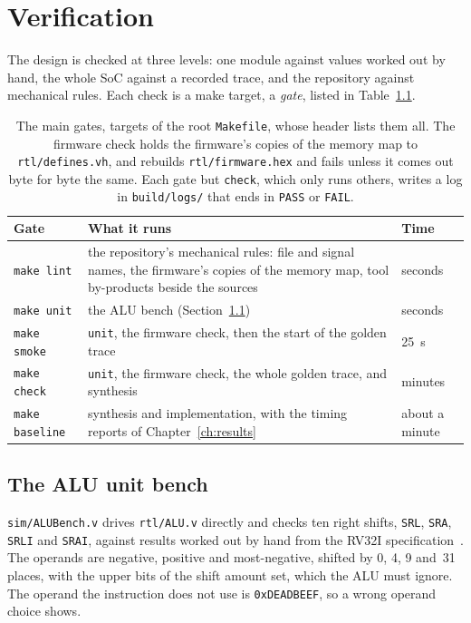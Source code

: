 \documentclass[11pt,a4paper]{report}
\begin{document}
\chapter{Verification}
\label{ch:verif}

The design is checked at three levels: one module against values worked out by hand, the
whole SoC against a recorded trace, and the repository against mechanical rules. Each check
is a make target, a \emph{gate}, listed in Table~\ref{tab:gates}.

\begin{table}[!ht]
  \centering
  \small
  \begin{tabular}{@{}l>{\raggedright\arraybackslash}p{9.4cm}l@{}}
    \toprule
    Gate & What it runs & Time \\
    \midrule
    \texttt{make lint} & the repository's mechanical rules: file and signal names, the
      firmware's copies of the memory map, tool by-products beside the sources & seconds \\
    \texttt{make unit} & the ALU bench (Section~\ref{sec:alu-bench}) & seconds \\
    \texttt{make smoke} & \texttt{unit}, the firmware check, then the start of the golden
      trace & 25~s \\
    \texttt{make check} & \texttt{unit}, the firmware check, the whole golden trace, and
      synthesis & minutes \\
    \texttt{make baseline} & synthesis and implementation, with the timing reports of
      Chapter~\ref{ch:results} & about a minute \\
    \bottomrule
  \end{tabular}
  \caption{The main gates, targets of the root \texttt{Makefile}, whose header lists them
    all. The firmware check holds the firmware's copies of the memory map to
    \texttt{rtl/defines.vh}, and rebuilds \texttt{rtl/firmware.hex} and fails unless it comes
    out byte for byte the same. Each gate but \texttt{check}, which only runs others, writes a
    log in
    \texttt{build/logs/} that ends in \texttt{PASS} or \texttt{FAIL}.}
  \label{tab:gates}
\end{table}

\section{The ALU unit bench}
\label{sec:alu-bench}

\texttt{sim/ALUBench.v} drives \texttt{rtl/ALU.v} directly and checks ten right shifts,
\texttt{SRL}, \texttt{SRA}, \texttt{SRLI} and \texttt{SRAI}, against results worked out by
hand from the RV32I specification~\cite{riscv-isa}. The operands are negative, positive and
most-negative, shifted by 0, 4, 9 and~31 places, with the upper bits of the shift amount set,
which the ALU must ignore. The operand the instruction does not use is \texttt{0xDEADBEEF},
so a wrong operand choice shows.
\end{document}
